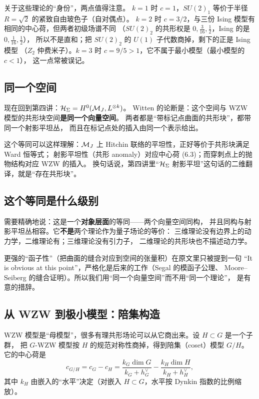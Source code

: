关于这些理论的“身份”，两点值得注意。
$k=1$ 时 $c=1$，$SU(2)_1$ 等价于半径 $R=\sqrt2$ 的紧致自由玻色子（自对偶点）。
$k=2$ 时 $c=3/2$，与三份 Ising 模型有相同的中心荷，但两者初级场谱不同
（$SU(2)_2$ 的共形权是 $0,\frac{3}{16},\frac12$，Ising 的是 $0,\frac{1}{16},\frac12$），
所以不是直和；把 $SU(2)_2$ 的 $U(1)$ 子代数商掉，剩下的正是 Ising 模型
（$Z_2$ 仲费米子）。$k=3$ 时 $c=9/5>1$，它不属于最小模型（最小模型的 $c<1$），
这一点常被误记。

\subsection{同一个空间}

现在回到第四讲：$\mathcal{H}_\Sigma=H^0(\mathcal{M}_J,L^{\otimes k})$。
Witten 的论断是：这个空间与 WZW 模型的共形块空间\textbf{是同一个向量空间}。
两者都是“带标记点曲面的共形块”，都带同一个射影平坦丛，
而且在标记点处的插入由同一个表示给出。

这个等同可以这样理解：$\mathcal{M}_J$ 上 Hitchin 联络的平坦性，正好等价于共形块满足 Ward 恒等式；
射影平坦性（共形 anomaly）对应中心荷 (6.3)；而穿刺点上的抛物结构对应 WZW 的插入。
换句话说，第四讲里“$\mathcal{H}_\Sigma$ 射影平坦”这句话的二维翻译，就是“存在共形块”。

\subsection{这个等同是什么级别}

需要精确地说：这是一个\textbf{对象层面}的等同——两个向量空间同构，
并且同构与射影平坦丛相容。它\textbf{不是}两个理论作为量子场论的等价：
三维理论没有边界上的动力学，二维理论有；三维理论没有引力子，
二维理论的共形块也不描述动力学。

更强的“函子性”（把曲面的缝合对应到空间的张量积）在原文里只被提到一句
“It is obvious at this point”，严格化是后来的工作（Segal 的模函子公理、
Moore--Seiberg 的缝合证明）。所以我们用“同一个向量空间”而不用“同一个理论”，
是有意的措辞。

\subsection{从 WZW 到极小模型：陪集构造}

WZW 模型是“母模型”，很多有理共形场论可以从它商出来。设 $H\subset G$ 是一个子群，
把 $G$-WZW 模型按 $H$ 的规范对称性商掉，得到陪集（coset）模型 $G/H$。
它的中心荷是
\[
c_{G/H}=c_G-c_H=\frac{k_G\dim G}{k_G+h^\vee_G}-\frac{k_H\dim H}{k_H+h^\vee_H},
\]
其中 $k_H$ 由嵌入的“水平”决定（对嵌入 $H\subset G$，水平按 Dynkin 指数的比例缩放）。

